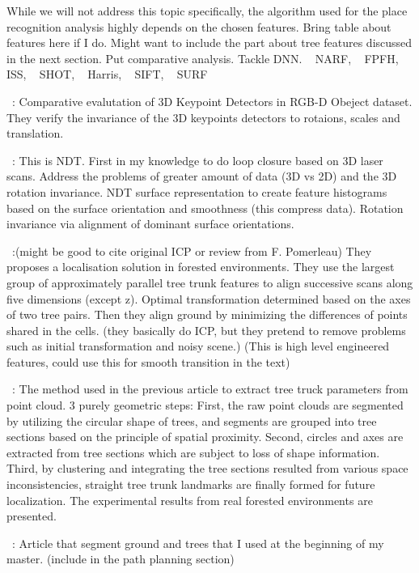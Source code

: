 While we will not address this topic specifically, the algorithm used for the place recognition analysis highly depends on the chosen features.  
Bring table about features here if I do. Might want to include the part about tree features discussed in the next section. Put comparative analysis. Tackle DNN.
~\cite{Steder2011a} NARF, ~\cite{Rusu2009} FPFH, ~\cite{Yu2009} ISS, ~\cite{Tombari2010} SHOT, ~\cite{Harris1988} Harris, ~\cite{Lowe2004} SIFT, ~\cite{Bay2006} SURF

~\cite{Filipe2014}:
Comparative evalutation of 3D Keypoint Detectors in RGB-D Obeject dataset. They verify the invariance of the 3D keypoints detectors to rotaions, scales and translation.

~\cite{Magnusson2009}:
This is NDT. First in my knowledge to do loop closure based on 3D laser scans. Address the problems of greater amount of data (3D vs 2D) and the 3D rotation invariance. NDT surface representation to create feature histograms based on the surface orientation and smoothness (this compress data). Rotation invariance via alignment of dominant surface orientations.

~\cite{Song2012}:(might be good to cite original ICP or review from F. Pomerleau)
They proposes a localisation solution in forested environments. They use the largest group of approximately parallel tree trunk features to align successive scans along five dimensions (except z). Optimal transformation determined based on the axes of two tree pairs. Then they align ground by minimizing the differences of points shared in the cells. (they basically do ICP, but they pretend to remove problems such as initial transformation and noisy scene.) (This is high level engineered features, could use this for smooth transition in the text)

~\cite{Iagnemma2012}:
The method used in the previous article to extract tree truck parameters from point cloud. 3 purely geometric steps: First, the raw point clouds are segmented by utilizing the circular shape of trees, and segments are grouped into tree sections based on the principle of spatial proximity. Second, circles and axes are extracted from tree sections which are subject to loss of shape information. Third, by clustering and integrating the tree sections resulted from various space inconsistencies, straight tree trunk landmarks are finally formed for future localization. The experimental results from real forested environments are presented.

~\cite{Mcdaniel2012}:
Article that segment ground and trees that I used at the beginning of my master. (include in the path planning section)

